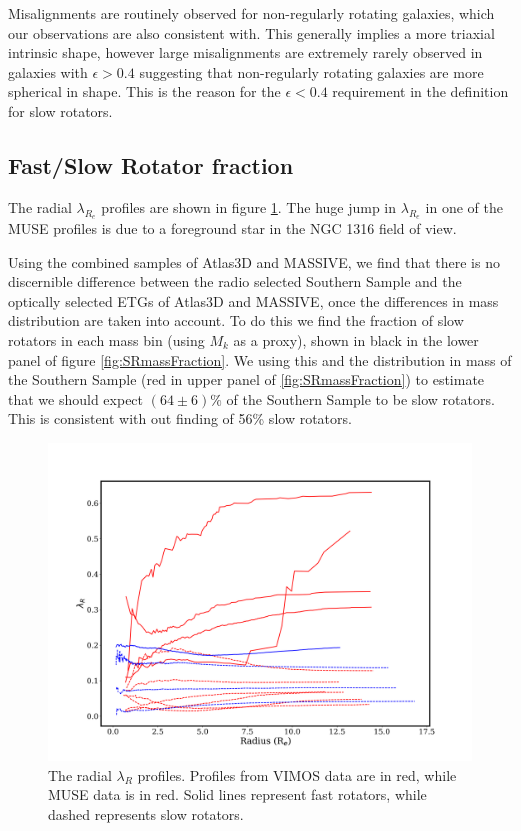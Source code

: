 		Misalignments are routinely observed for non-regularly rotating galaxies, which our observations are also consistent with. This generally implies a more triaxial intrinsic shape, however large misalignments are extremely rarely observed in galaxies with $\epsilon > 0.4$ suggesting that non-regularly rotating galaxies are more spherical in shape. This is the reason for the $\epsilon < 0.4$ requirement in the definition for slow rotators. 


	\subsection{Fast/Slow Rotator fraction}
		\label{subsec:FSfrac}
		The radial $\lambda_{R_e}$ profiles are shown in figure \ref{fig:lambdaR_profile}. The huge jump in $\lambda_{R_e}$ in one of the MUSE profiles is due to a foreground star in the NGC 1316 field of view. 

		Using the combined samples of Atlas3D and MASSIVE, we find that there is no discernible difference between the radio selected Southern Sample and the optically selected ETGs of Atlas3D and MASSIVE, once the differences in mass distribution are taken into account. To do this we find the fraction of slow rotators in each mass bin (using $M_k$ as a proxy), shown in black in the lower panel of figure \ref{fig:SRmassFraction}. We using this and the distribution in mass of the Southern Sample (red in upper panel of \ref{fig:SRmassFraction}) to estimate that we should expect $(64 \pm 6)\%$ of the Southern Sample to be slow rotators. This is consistent with out finding of 56\% slow rotators.

		\begin{figure}
			\centering
			\includegraphics[width=\textwidth]{chapter4/lambda_R.png}
			\caption[$\lambda_{R}$ radial profiles]{The radial $\lambda_{R}$ profiles. Profiles from VIMOS data are in red, while MUSE data is in red. Solid lines represent fast rotators, while dashed represents slow rotators.}
			\label{fig:lambdaR_profile}
		\end{figure}


